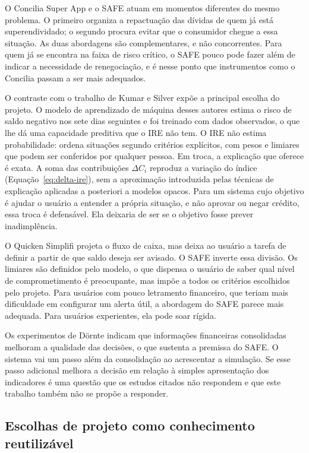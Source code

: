 \documentclass[portuguese]{sbc2025}%
\begin{document}
O Concilia Super App e o SAFE atuam em momentos diferentes do mesmo problema. O primeiro organiza a repactuação das dívidas de quem já está superendividado; o segundo procura evitar que o consumidor chegue a essa situação. As duas abordagens são complementares, e não concorrentes. Para quem já se encontra na faixa de risco crítico, o SAFE pouco pode fazer além de indicar a necessidade de renegociação, e é nesse ponto que instrumentos como o Concilia passam a ser mais adequados.

O contraste com o trabalho de Kumar e Silver \citeyearpar{kumar2024} expõe a principal escolha do projeto. O modelo de aprendizado de máquina desses autores estima o risco de saldo negativo nos sete dias seguintes e foi treinado com dados observados, o que lhe dá uma capacidade preditiva que o IRE não tem. O IRE não estima probabilidade: ordena situações segundo critérios explícitos, com pesos e limiares que podem ser conferidos por qualquer pessoa. Em troca, a explicação que oferece é exata. A soma das contribuições $\Delta C_i$ reproduz a variação do índice (Equação~\ref{eq:delta-ire}), sem a aproximação introduzida pelas técnicas de explicação aplicadas a posteriori a modelos opacos. Para um sistema cujo objetivo é ajudar o usuário a entender a própria situação, e não aprovar ou negar crédito, essa troca é defensável. Ela deixaria de ser se o objetivo fosse prever inadimplência.

O Quicken Simplifi projeta o fluxo de caixa, mas deixa ao usuário a tarefa de definir a partir de que saldo deseja ser avisado. O SAFE inverte essa divisão. Os limiares são definidos pelo modelo, o que dispensa o usuário de saber qual nível de comprometimento é preocupante, mas impõe a todos os critérios escolhidos pelo projeto. Para usuários com pouco letramento financeiro, que teriam mais dificuldade em configurar um alerta útil, a abordagem do SAFE parece mais adequada. Para usuários experientes, ela pode soar rígida.

Os experimentos de Dörnte \citeyearpar{dornte2021} indicam que informações financeiras consolidadas melhoram a qualidade das decisões, o que sustenta a premissa do SAFE. O sistema vai um passo além da consolidação ao acrescentar a simulação. Se esse passo adicional melhora a decisão em relação à simples apresentação dos indicadores é uma questão que os estudos citados não respondem e que este trabalho também não se propõe a responder.

\subsection{Escolhas de projeto como conhecimento reutilizável}
\label{sec:disc-escolhas}
\end{document}
